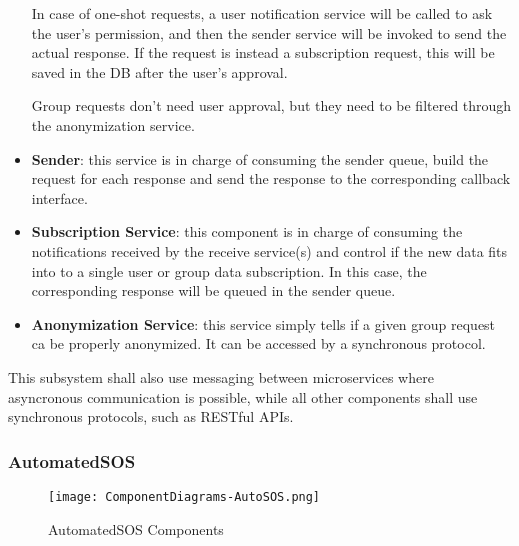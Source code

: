 \begin{itemize}
	In case of one-shot requests, a user notification service will be called to ask the user's permission, and then the sender service will be invoked to send the actual response.
	If the request is instead a subscription request, this will be saved in the DB after the user's approval.
	
	Group requests don't need user approval, but they need to be filtered through the anonymization service.
	\item \textbf{Sender}: this service is in charge of consuming the sender queue, build the request for each response and send the response to the corresponding callback interface.
	\item \textbf{Subscription Service}: this component is in charge of consuming the notifications received by the receive service(s) and control if the new data fits into to a single user or group data subscription. In this case, the corresponding response will be queued in the sender queue.
	\item \textbf{Anonymization Service}: this service simply tells if a given group request ca be properly anonymized. It can be accessed by a synchronous protocol.
\end{itemize}

This subsystem shall also use messaging between microservices where asyncronous communication is possible, while all other components shall use synchronous protocols, such as RESTful APIs.

\subsubsection{AutomatedSOS}

\FloatBarrier
\begin{figure}[!h]
	\centering
	\texttt{[image: ComponentDiagrams-AutoSOS.png]}
	\caption{AutomatedSOS Components}
\end{figure}
\FloatBarrier

